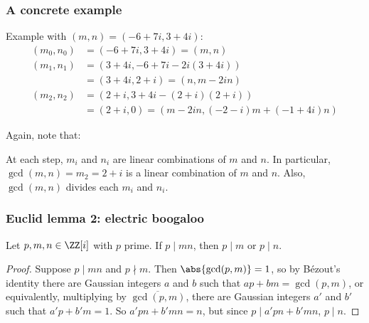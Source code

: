 \documentclass{beamer}
\begin{document}
\begin{frame}
	\frametitle{A concrete example}
	Example with $(m,n) = (-6 + 7i,3 + 4i)$:
	\begin{align*}
		(m_0,n_0) &= (-6 + 7i,3 + 4i) = (m,n) \\
		(m_1,n_1) &= (3 + 4i,-6 + 7i - 2i(3 + 4i)) \\
		&= (3 + 4i,2 + i) = (n,m - 2in) \\
		(m_2,n_2) &= (2 + i,3 + 4i - (2 + i)(2 + i)) \\
		&= (2 + i,0) = (m - 2in,(-2 - i)m + (-1 + 4i)n)
	\end{align*}

	Again, note that:
	\begin{itemize}
		\ii At each step, $m_i$ and $n_i$ are linear combinations of $m$ and $n$.
		\ii In particular, $\gcd(m,n) = m_2 = 2 + i$ is a linear combination of $m$ and $n$.
		\ii Also, $\gcd(m,n)$ divides each $m_i$ and $n_i$.
	\end{itemize}
\end{frame}

\begin{frame}
	\frametitle{Euclid lemma 2: electric boogaloo}
	\begin{lemma}
		Let $p,m,n \in \ZZ[i]$ with $p$ prime. If $p \mid mn$, then $p \mid m$ or $p \mid n$.
	\end{lemma}
	
	\begin{proof}
		Suppose $p \mid mn$ and $p \nmid m$. Then $\abs{\gcd(p,m)} = 1$, so by B\'ezout's identity there are Gaussian integers $a$ and $b$ such that $ap + bm = \gcd(p,m)$, or equivalently, multiplying by $\overline{\gcd(p,m)}$, there are Gaussian integers $a'$ and $b'$ such that $a'p + b'm = 1$. So $a'pn + b'mn = n$, but since $p \mid a'pn + b'mn$, $p \mid n$.
	\end{proof}
\end{frame}
\end{document}
